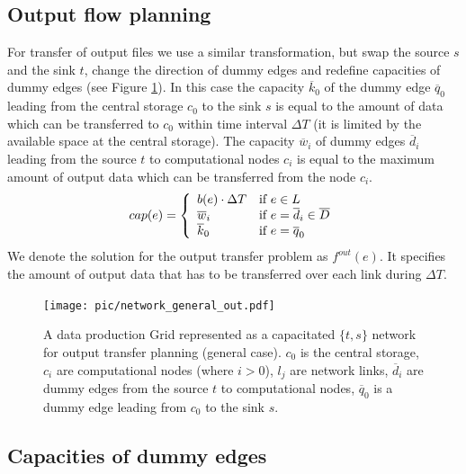 \documentclass{svjour3}                     %
\begin{document}
\subsection{Output flow planning}
\label{outproblem}
For transfer of output files we use a similar transformation, but swap the
source $s$ and the sink $t$, change the direction of dummy edges and redefine
capacities of dummy edges (see Figure \ref{general_out}). In this case the capacity $\overline{k}_{0}$ of the
dummy edge $\overline{q}_{0}$ leading from the central storage $c_0$ to the
sink $s$ is equal to the amount of data which can be transferred to $c_0$
within time interval $\Delta T$ (it is limited by the available space at the
central storage). The capacity $\overline{w}_{i}$ of dummy edges
$\overline{d}_{i}$ leading from the source $t$ to computational nodes $c_{i}$
is equal to the maximum amount of output data which can be transferred from
the node $c_{i}$.
%
\begin{equation}
\label{edge_cap_out}
cap(e) = \left\{ 
  \begin{array}{l l}
    b(e) \cdot \Delta T & \text{if }e \in L \\
    \overline{w}_{i} & \text{if } e = \overline{d}_{i} \in \overline{D}\\
    \overline{k}_{0} & \text{if } e = \overline{q}_{0}
  \end{array} \right.
\end{equation}
%
We denote the solution for the output transfer problem as $f^{out}(e)$. It specifies the amount of output data that has to be transferred over each link during $\Delta T$.
\begin{figure}[b]
	\begin{center}
		\texttt{[image: pic/network\_general\_out.pdf]}
	\end{center}
	\caption{A data production Grid represented as a capacitated $\{t,s\}$ network for output transfer planning (general case). $c_{0}$ is the central storage, $c_{i}$ are computational nodes (where $i>0$), $l_{j}$ are network links, $\overline{d}_{i}$ are dummy edges from the source $t$ to computational nodes, $\overline{q}_{0}$ is a dummy edge leading from $c_{0}$ to the sink $s$. }
	\label{general_out}	
\end{figure}

\subsection{Capacities of dummy edges}
\end{document}
